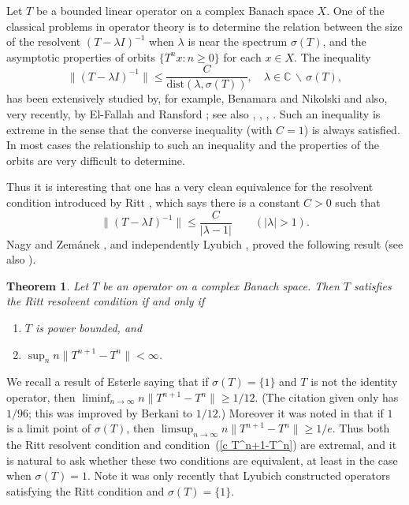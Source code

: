\documentclass[12pt]{amsart}
\newtheorem{thm}{Theorem}[section]
\newcommand{\modo}[1]{{\left|#1\right|}}
\newcommand{\snormo}[1]{{\mathopen\|#1\mathclose\|}}
\begin{document}
Let $T$ be a bounded linear operator on a complex Banach space $X$.
One of the classical problems in operator theory is to determine
the relation between the size of the resolvent $(T-\lambda I)^{-1}$
when $\lambda$ is
near the spectrum $\sigma(T)$, and the asymptotic properties of
orbits $\{T^n x:  n \ge 0\}$ for each $x \in X$.
The inequality
\[
\snormo{(T-\lambda I)^{-1}} \le \frac{C}{\text{dist}(\lambda, \sigma (T))} ,
\quad \lambda \in \mathbb C \, \backslash \, \sigma (T),
\]
has been extensively studied by,
for example, Benamara and Nikolski \cite{benamara-nikolski}
and also, very recently, by El-Fallah and Ransford \cite{el-fallah-ransford};
see also \cite{lyubich2}, \cite{nagy-zemanek}, \cite{nevanlinna2},
\cite{tomilov-zemanek}.
Such an inequality is extreme in the sense that the converse
inequality (with $C=1$) is always satisfied.
In most cases the relationship to such an inequality and the properties
of the orbits are very difficult to determine.

Thus it is interesting
that one has a very clean equivalence for the resolvent
condition introduced by Ritt \cite{ritt}, which says
there is a constant $C>0$ such that
$$ \snormo{(T-\lambda I)^{-1}} \le \frac C{\modo{\lambda-1}}
   \qquad (\modo\lambda > 1) .$$
Nagy and Zem\'anek \cite{nagy-zemanek}, and independently
Lyubich \cite{lyubich1}, proved the following result
(see also \cite[Theorem 4.5.4]{navanlinna1}).

\begin{thm}
\label{ritt} Let $T$ be an operator on a complex Banach space.
Then $T$ satisfies the Ritt resolvent condition if and only if
\begin{enumerate}
\item $T$ is power bounded, and
\item \label{c T^n+1-T^n}
$\sup_n n\snormo{T^{n+1}-T^n} < \infty$.
\end{enumerate}
\end{thm}

We recall a result of Esterle \cite{esterle} saying that if
$\sigma(T)=\{1\}$ and $T$ is not the identity operator, then
$\liminf_{n\to\infty} n\snormo{T^{n+1}-T^n} \ge 1/12$.  (The
citation given only has $1/96$; this was improved by Berkani
\cite{berkani} to $1/12$.)  Moreover it was noted in \cite[Theorem
4.5.1]{navanlinna1} that if $1$ is a limit point of $\sigma(T)$,
then $\limsup_{n\to\infty} n \snormo{T^{n+1} - T^n} \ge 1/e$. Thus both the
Ritt resolvent condition and condition~(\ref{c T^n+1-T^n}) are
extremal, and it is natural to ask whether these two conditions
are equivalent, at least in the case when $\sigma(T)=1$. Note it
was only recently that Lyubich \cite{lyubich2} constructed
operators satisfying the Ritt condition and $\sigma(T) = \{1\}$.
\end{document}
